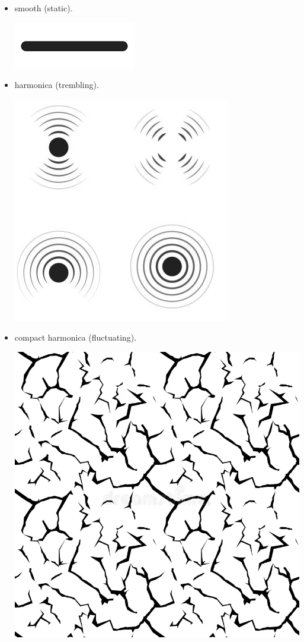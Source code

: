 \begin{enumerate}
\begin{itemize}
    \begin{itemize}
    \item smooth (static).
      \begin{center}  
      \includegraphics[scale=0.1]{../img/linea.png}
      \end{center}
    \item harmonica (trembling).
      \begin{center}
      \includegraphics[scale=0.45]{../img/tremore.png}
      \end{center}
    \item compact harmonica (fluctuating).
      \begin{center}
      \includegraphics[scale=0.1]{../img/scricchiolio.png}

\end{center}
\end{itemize}
\end{itemize}
\end{enumerate}
